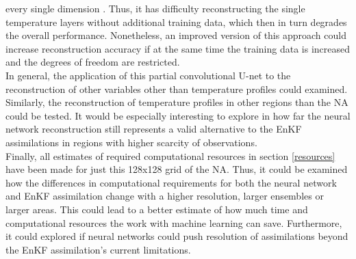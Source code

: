\documentclass[Masterarbeit.tex]{subfile}
\begin{document}
every single dimension \citep{bach_breaking_2017}. Thus, it has difficulty reconstructing the single temperature layers without additional training data, which then in turn degrades the overall performance. Nonetheless, an improved version of this approach could increase reconstruction accuracy if at the same time the training data is increased and the degrees of freedom are restricted. \\
	In general, the application of this partial convolutional U-net to the reconstruction of other variables other than temperature profiles could examined. Similarly, the reconstruction of temperature profiles in other regions than the NA could be tested. It would be especially interesting to explore in how far the neural network reconstruction still represents a valid alternative to the EnKF assimilations in regions with higher scarcity of observations. \\
	Finally, all estimates of required computational resources in section \ref{resources} have been made for just this 128x128 grid of the NA. Thus, it could be examined how the differences in computational requirements for both the neural network and EnKF assimilation change with a higher resolution, larger ensembles or larger areas. This could lead to a better estimate of how much time and computational resources the work with machine learning can save. Furthermore, it could explored if neural networks could push resolution of assimilations beyond the EnKF assimilation's current limitations. \\
	

		
		
		

		
		
		
		
		
		
		
	
	
	
	
	
	
	
	
	
	
	
	
	
	
	
\end{document}
